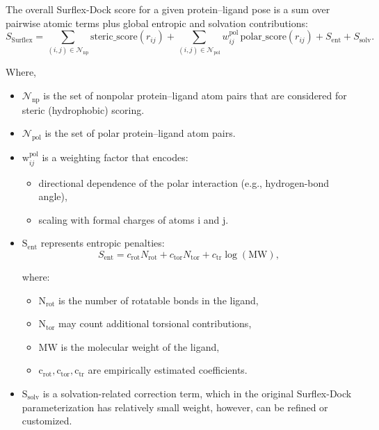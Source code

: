 \documentclass[12pt, a4paper]{article}
\begin{document}
The overall Surflex-Dock score for a given protein--ligand pose is a sum over pairwise atomic terms plus global entropic and solvation contributions:\cite{CH7_Jain2007Surflex21,CH7_Jain2006NegTrain}
\begin{equation}
  S_{\text{Surflex}}
  =
  \sum_{(i,j) \in \mathcal{N}_{\text{np}}}
    \text{steric\_score}\!\left( r_{ij} \right)
  +
  \sum_{(i,j) \in \mathcal{N}_{\text{pol}}}
    w_{ij}^{\text{pol}} \,
    \text{polar\_score}\!\left( r_{ij} \right)
  +
  S_{\text{ent}}
  +
  S_{\text{solv}}.
  \label{eq:surflex_total}
\end{equation}

Where, 
\begin{itemize}
  \item $\mathcal{N}_{\text{np}}$ is the set of nonpolar protein--ligand atom pairs that are considered for steric (hydrophobic) scoring.
  \item $\mathcal{N}_{\text{pol}}$ is the set of polar protein--ligand atom pairs.
  \item $\text{w}_{ij}^{\text{pol}}$ is a weighting factor that encodes:
  \begin{itemize}
    \item directional dependence of the polar interaction (e.g., hydrogen-bond angle),
    \item scaling with formal charges of atoms i and j.
  \end{itemize}
  \item $\text{S}_{\text{ent}}$ represents entropic penalties:
  \begin{equation}
    S_{\text{ent}}
    =
    c_{\text{rot}} N_{\text{rot}}
    +
    c_{\text{tor}} N_{\text{tor}}
    +
    c_{\text{tr}} \log\!\left(\text{MW}\right),
    \label{eq:entropic}
  \end{equation}

  where:
  \begin{itemize}
    \item $\text{N}_{\text{rot}}$ is the number of rotatable bonds in the ligand,
    \item $\text{N}_{\text{tor}}$ may count additional torsional contributions,
    \item $\text{MW}$ is the molecular weight of the ligand,
    \item $\text{c}_{\text{rot}}, \text{c}_{\text{tor}}, \text{c}_{\text{tr}}$ are empirically estimated coefficients.
  \end{itemize}
  \item $\text{S}_{\text{solv}}$ is a solvation-related correction term, which in the original Surflex-Dock parameterization has relatively small weight, however, can be refined or customized.\cite{CH7_Jain2007Surflex21}
\end{itemize}
\end{document}
